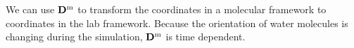 We can use ${\bf{D}}^{\text{m}}$ to transform the coordinates in a molecular framework to coordinates in the lab framework. 
Because the orientation of water molecules is changing during the simulation, 
${\bf{D}}^{\text{m}}$ is time dependent. 

